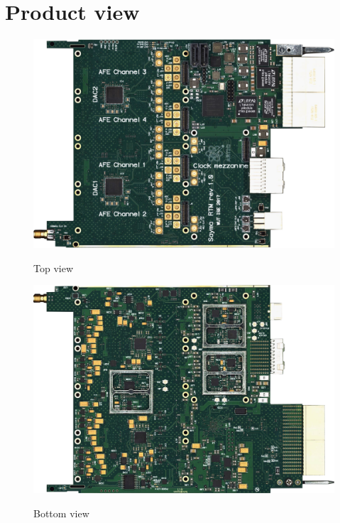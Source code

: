 
\section{Product view}	
	
	\begin{figure}[htbp!]
		\centering
		\includegraphics[width=17cm]{img/top1.jpg}\\
		\caption{Top view}
	\end{figure}
	
		\begin{figure}[htbp!]
			\centering
			\includegraphics[width=17cm]{img/bot1.jpg}\\
			\caption{Bottom view}
		\end{figure}

%	
